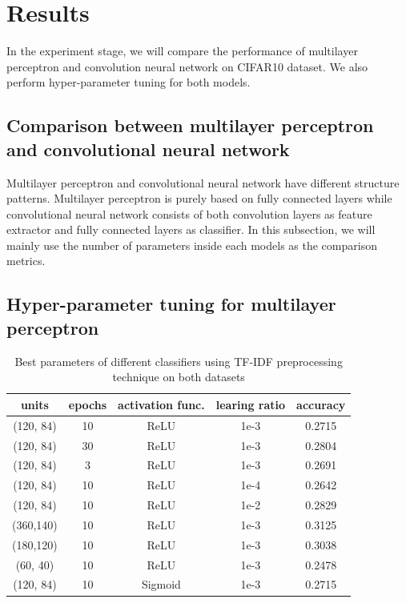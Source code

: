 \documentclass[11pt]{scrartcl}
\begin{document}
\section{Results}
In the experiment stage, we will compare the performance of multilayer perceptron and convolution neural network on CIFAR10 dataset\cite{krizhevsky2009learning}. We also perform hyper-parameter tuning for both models.

\subsection{Comparison between multilayer perceptron and convolutional neural network}

Multilayer perceptron and convolutional neural network have different structure patterns. Multilayer perceptron is purely based on fully connected layers while convolutional neural network consists of both convolution layers as feature extractor and fully connected layers as classifier. In this subsection, we will mainly use the number of parameters inside each models as the comparison metrics.


\subsection{Hyper-parameter tuning for multilayer perceptron}

\begin{table}[H]
	\centering
	\begin{tabular}{ccccc}
		\hline
		  units & epochs & activation func. & learing ratio & accuracy  \\
		\hline
		  (120, 84) & 10 & ReLU & 1e-3 & 0.2715 \\
		 \hline
		  (120, 84) & 30 & ReLU & 1e-3 & 0.2804 \\
		  (120, 84) & 3  & ReLU & 1e-3 & 0.2691 \\
		 \hline
		  (120, 84) & 10 & ReLU & 1e-4 & 0.2642 \\
		  (120, 84) & 10 & ReLU & 1e-2 & 0.2829 \\
		 \hline
		  (360,140) & 10 & ReLU & 1e-3 & 0.3125 \\
		  (180,120) & 10 & ReLU & 1e-3 & 0.3038 \\
		  (60, 40)  & 10 & ReLU & 1e-3 & 0.2478 \\
		 \hline
		  (120, 84) & 10 & Sigmoid & 1e-3 & 0.2715 \\
		\hline
	\end{tabular} 
	\caption{Best parameters of different classifiers using TF-IDF preprocessing technique on both datasets}
	\label{params}
\end{table}
\end{document}
